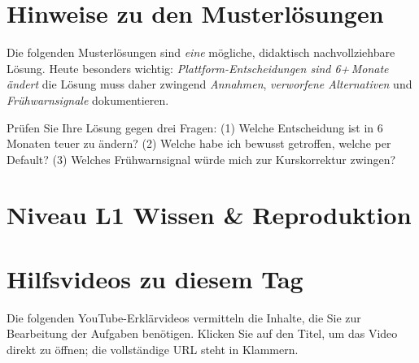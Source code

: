 \documentclass[11pt,a4paper,oneside]{article}
\begin{document}
\section*{Hinweise zu den Musterl\"osungen}
\thispagestyle{plain}

\noindent Die folgenden Musterl\"osungen sind \emph{eine} m\"ogliche, didaktisch nachvollziehbare L\"osung. Heute besonders wichtig: \emph{Plattform-Entscheidungen sind 6+\,Monate \"andert} \textendash{} die L\"osung muss daher zwingend \emph{Annahmen}, \emph{verworfene Alternativen} und \emph{Fr\"uhwarnsignale} dokumentieren.

\begin{infobox}
Pr\"ufen Sie Ihre L\"osung gegen drei Fragen: (1) Welche Entscheidung ist in 6\,Monaten teuer zu \"andern? (2) Welche habe ich bewusst getroffen, welche per Default? (3) Welches Fr\"uhwarnsignal w\"urde mich zur Kurskorrektur zwingen?
\end{infobox}

\clearpage

\section*{Niveau L1 \textendash{} Wissen \& Reproduktion}

\section*{Hilfsvideos zu diesem Tag}
\thispagestyle{plain}

\noindent Die folgenden YouTube-Erkl\"arvideos vermitteln die Inhalte, die Sie zur Bearbeitung der Aufgaben ben\"otigen. Klicken Sie auf den Titel, um das Video direkt zu \"offnen; die vollst\"andige URL steht in Klammern.
\end{document}
